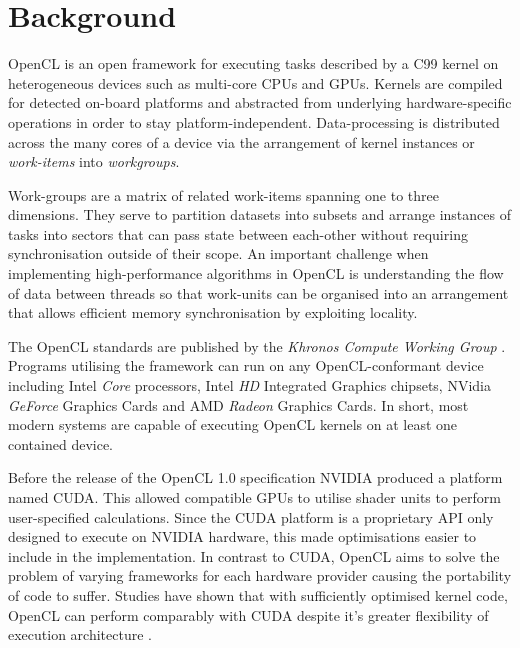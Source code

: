 \section{Background}
OpenCL is an open framework for executing tasks described by a C99 kernel on heterogeneous devices such as multi-core CPUs and GPUs. Kernels are compiled for detected on-board platforms and abstracted from underlying hardware-specific operations in order to stay platform-independent. Data-processing is distributed across the many cores of a device via the arrangement of kernel instances or \emph{work-items} into \emph{workgroups}.

Work-groups are a matrix of related work-items spanning one to three dimensions. They serve to partition datasets into subsets and arrange instances of tasks into sectors that can pass state between each-other without requiring synchronisation outside of their scope. An important challenge when implementing high-performance algorithms in OpenCL is understanding the flow of data between threads so that work-units can be organised into an arrangement that allows efficient memory synchronisation by exploiting locality. \cite{bestpractice}

The OpenCL standards are published by the \emph{Khronos Compute Working Group} \cite{khronos}.
Programs utilising the framework can run on any OpenCL-conformant device including Intel \emph{Core} processors, Intel \emph{HD} Integrated Graphics chipsets, NVidia \emph{GeForce} Graphics Cards and AMD \emph{Radeon} Graphics Cards.
In short, most modern systems are capable of executing OpenCL kernels on at least one contained device.

Before the release of the OpenCL 1.0 specification NVIDIA produced a platform named \ac{CUDA}. This allowed compatible GPUs to utilise shader units to perform user-specified calculations. Since the CUDA platform is a proprietary API only designed to execute on NVIDIA hardware, this made optimisations easier to include in the implementation. In contrast to CUDA, OpenCL aims to solve the problem of varying frameworks for each hardware provider causing the portability of code to suffer. Studies have shown that with sufficiently optimised kernel code, OpenCL can perform comparably with CUDA despite it's greater flexibility of execution architecture \cite{perf}.
